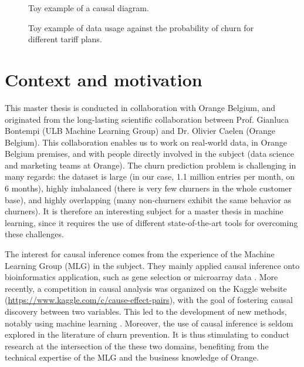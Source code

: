 \begin{figure}
    \centering
    \caption{Toy example of a causal diagram.}
    \label{simple_causal}
\end{figure}

\begin{figure}
    \centering
    
    \caption{Toy example of data usage against the probability of churn for
    different tariff plans.}
    \label{simple_causal_plot}
\end{figure}

\section{Context and motivation}

This master thesis is conducted in collaboration with Orange Belgium, and
originated from the long-lasting scientific collaboration between Prof. Gianluca
Bontempi (ULB Machine Learning Group) and Dr. Olivier Caelen (Orange Belgium).
This collaboration enables us to work on real-world data, in Orange Belgium
premises, and with people directly involved in the subject (data science and
marketing teams at Orange). The churn prediction problem is challenging in many
regards: the dataset is large (in our case, 1.1 million entries per month, on 6
months), highly imbalanced (there is very few churners in the whole customer
base), and highly overlapping (many non-churners exhibit the same behavior as
churners). It is therefore an interesting subject for a master thesis in machine
learning, since it requires the use of different state-of-the-art tools for
overcoming these challenges.

The interest for causal inference comes from the experience of the Machine
Learning Group (MLG) in the subject. They mainly applied causal inference onto
bioinformatics application, such as gene selection
\parencite{bontempi2011multiple} or microarray data
\parencite{bontempi2010causal}. More recently, a competition in causal analysis
was organized on the Kaggle website
(\url{https://www.kaggle.com/c/cause-effect-pairs}), with the goal of fostering
causal discovery between two variables. This led to the development of new
methods, notably using machine learning \parencite{bontempi2015dependency}.
Moreover, the use of causal inference is seldom explored in the literature of
churn prevention. It is thus stimulating to conduct research at the intersection
of the these two domains, benefiting from the technical expertise of the MLG and
the business knowledge of Orange.

